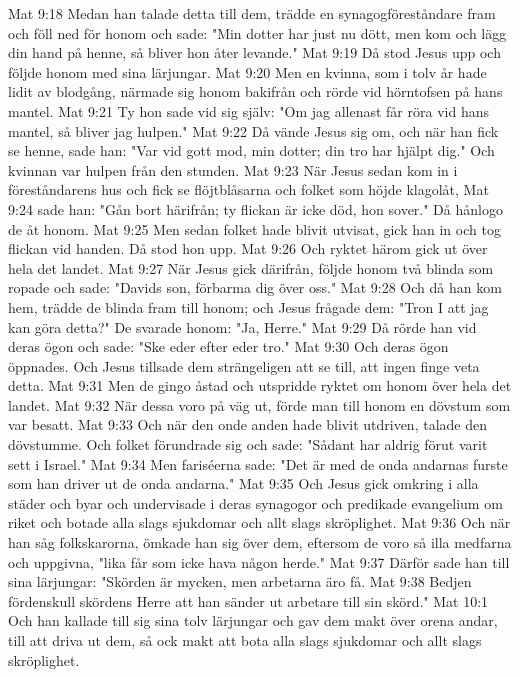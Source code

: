 Mat 9:18  Medan han talade detta till dem, trädde en synagogföreståndare fram och föll ned för honom och sade: "Min dotter har just nu dött, men kom och lägg din hand på henne, så bliver hon åter levande."
Mat 9:19  Då stod Jesus upp och följde honom med sina lärjungar.
Mat 9:20  Men en kvinna, som i tolv år hade lidit av blodgång, närmade sig honom bakifrån och rörde vid hörntofsen på hans mantel.
Mat 9:21  Ty hon sade vid sig själv: "Om jag allenast får röra vid hans mantel, så bliver jag hulpen."
Mat 9:22  Då vände Jesus sig om, och när han fick se henne, sade han: "Var vid gott mod, min dotter; din tro har hjälpt dig." Och kvinnan var hulpen från den stunden.
Mat 9:23  När Jesus sedan kom in i föreståndarens hus och fick se flöjtblåsarna och folket som höjde klagolåt,
Mat 9:24  sade han: "Gån bort härifrån; ty flickan är icke död, hon sover." Då hånlogo de åt honom.
Mat 9:25  Men sedan folket hade blivit utvisat, gick han in och tog flickan vid handen. Då stod hon upp.
Mat 9:26  Och ryktet härom gick ut över hela det landet.
Mat 9:27  När Jesus gick därifrån, följde honom två blinda som ropade och sade: "Davids son, förbarma dig över oss."
Mat 9:28  Och då han kom hem, trädde de blinda fram till honom; och Jesus frågade dem: "Tron I att jag kan göra detta?" De svarade honom: "Ja, Herre."
Mat 9:29  Då rörde han vid deras ögon och sade: "Ske eder efter eder tro."
Mat 9:30  Och deras ögon öppnades. Och Jesus tillsade dem strängeligen att se till, att ingen finge veta detta.
Mat 9:31  Men de gingo åstad och utspridde ryktet om honom över hela det landet.
Mat 9:32  När dessa voro på väg ut, förde man till honom en dövstum som var besatt.
Mat 9:33  Och när den onde anden hade blivit utdriven, talade den dövstumme. Och folket förundrade sig och sade: "Sådant har aldrig förut varit sett i Israel."
Mat 9:34  Men fariséerna sade: "Det är med de onda andarnas furste som han driver ut de onda andarna."
Mat 9:35  Och Jesus gick omkring i alla städer och byar och undervisade i deras synagogor och predikade evangelium om riket och botade alla slags sjukdomar och allt slags skröplighet.
Mat 9:36  Och när han såg folkskarorna, ömkade han sig över dem, eftersom de voro så illa medfarna och uppgivna, "lika får som icke hava någon herde."
Mat 9:37  Därför sade han till sina lärjungar: "Skörden är mycken, men arbetarna äro få.
Mat 9:38  Bedjen fördenskull skördens Herre att han sänder ut arbetare till sin skörd."
Mat 10:1  Och han kallade till sig sina tolv lärjungar och gav dem makt över orena andar, till att driva ut dem, så ock makt att bota alla slags sjukdomar och allt slags skröplighet.
